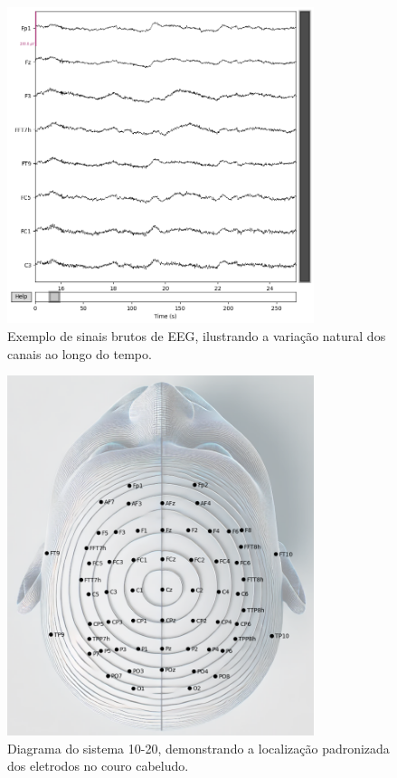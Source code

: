 \begin{figure}[htb]
    \centering
    \includegraphics[width=0.8\textwidth]{figs/1_preprocessamento_eeg/2_exemplo_sinais_canais_eeg.png}
    \caption{Exemplo de sinais brutos de EEG, ilustrando a variação natural dos canais ao longo do tempo.}
    \label{fig:exemplo_sinais_eeg}
\end{figure}

\begin{figure}[htb]
    \centering
    \includegraphics[width=0.8\textwidth]{figs/1_preprocessamento_eeg/1_sistema_10_20.png}
    \caption{Diagrama do sistema 10-20, demonstrando a localização padronizada dos eletrodos no couro cabeludo.}
    \label{fig:sistema_10_20}
\end{figure}


